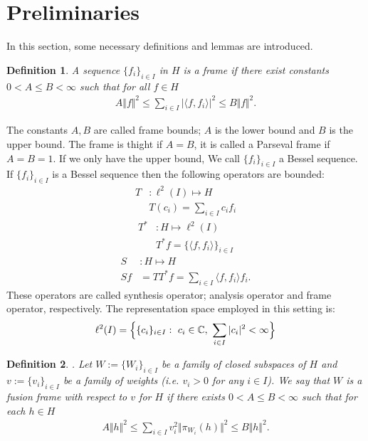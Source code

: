 \documentclass{mfatshort}
\newtheorem{definition}{Definition}
\begin{document}
\section{Preliminaries}
In this section, some necessary definitions and lemmas are introduced.\\
\begin{definition}
A sequence $\lbrace f_{i} \rbrace _{i\in I}$ in  $H$ is a frame  if there exist constants $0 <A \leqslant B <\infty$ such that for all $f\in H$
\begin{align*}
A\Vert f \Vert ^{2}\leqslant \sum _{i\in I} \vert\langle f,f_{i}\rangle\vert^{2}\leqslant B \Vert f \Vert ^{2}.
\end{align*}
\end{definition}
The constants $A,B$ are called frame bounds; $A$ is the lower bound and $B$ is the upper bound. The frame is thight if $A=B$, it is called a Parseval frame if $A=B=1$. If  we only have the upper bound, We call $\lbrace f_{i} \rbrace _{i\in I}$ a Bessel sequence. If $\lbrace f_{i} \rbrace _{i\in I}$ is a Bessel sequence then the following operators are bounded:
\begin{align*}
T&:\ell^{2}(I)\longmapsto H\\
&T(c_{i})=\sum _{i\in I}c_{i}f_{i}
\end{align*}
\begin{align*}
T^{*}&:H\longmapsto\ell^{2}(I)\\
&T^{*}f=\lbrace\langle f,f_{i}\rangle\rbrace _{i\in I}
\end{align*}
\begin{align*}
S&:H\longmapsto H\\
Sf&=TT^{*}f=\sum _{i\in I} \langle f,f_{i}\rangle f_{i}.
\end{align*}
These operators are called synthesis operator; analysis operator and frame operator,   respectively. The representation space employed in this setting is:
\begin{align*}
\ell^{2}(I)=\Big\lbrace\lbrace c_{i}\rbrace_{i\in I}:\ c_{i}\in\Bbb C ,\ \sum _{i\in I}\vert c_{i} \vert ^{2}<\infty \Big\rbrace
\end{align*}
\begin{definition}.
Let $W:=\{W_i\}_{i\in I}$ be a family of closed subspaces of $H$ and $v:=\{v_i\}_{i\in I}$ be a family of weights (i.e. $v_i>0$ for any $i\in I$). We say that $W$ is a fusion frame with respect to $v$ for $H$ if there exists $0<A\leq B<\infty$ such that for each $h\in H$
\begin{eqnarray*}
A\Vert h\Vert^2\leq\sum_{i\in I}v^{2}_i\Vert \pi_{W_i}(h)\Vert^2\leq B\Vert h\Vert^2.
\end{eqnarray*}
\end{definition}
\end{document}
